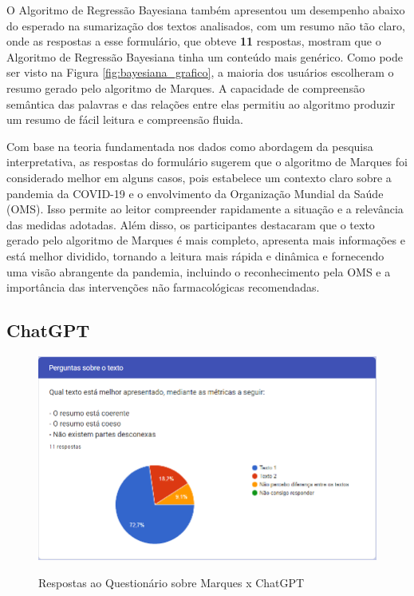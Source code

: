 O Algoritmo de Regressão Bayesiana também apresentou um desempenho abaixo do esperado na sumarização dos textos analisados, com um resumo não tão claro, onde as respostas a esse formulário, que obteve \textbf{11} respostas, mostram que o Algoritmo de Regressão Bayesiana tinha um conteúdo mais genérico. Como pode ser visto na Figura \ref{fig:bayesiana_grafico}, a maioria dos usuários escolheram o resumo gerado pelo algoritmo de Marques. A capacidade de compreensão semântica das palavras e das relações entre elas permitiu ao algoritmo produzir um resumo de fácil leitura e compreensão fluida.

Com base na teoria fundamentada nos dados como abordagem da pesquisa interpretativa, as respostas do formulário sugerem que o algoritmo de Marques foi considerado melhor em alguns casos, pois estabelece um contexto claro sobre a pandemia da COVID-19 e o envolvimento da Organização Mundial da Saúde (OMS). Isso permite ao leitor compreender rapidamente a situação e a relevância das medidas adotadas. Além disso, os participantes destacaram que o texto gerado pelo algoritmo de Marques é mais completo, apresenta mais informações e está melhor dividido, tornando a leitura mais rápida e dinâmica e fornecendo uma visão abrangente da pandemia, incluindo o reconhecimento pela OMS e a importância das intervenções não farmacológicas recomendadas.

\subsection{ChatGPT}
\label{chap:gpt}

\begin{figure}[!h]
    \centering
     \caption{Respostas ao Questionário sobre Marques x ChatGPT}
    \includegraphics[width=\textwidth]{figuras/graficos/chatgpt.png}
    \label{fig:gpt_grafico}
\end{figure}

